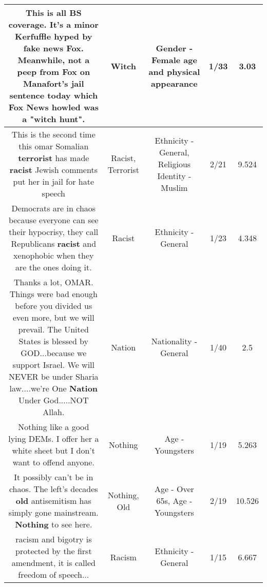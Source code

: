 \documentclass[11pt]{article}
\newlength\mylength
\begin{document}
\begin{center}
\begin{longtable}{|C{.65\mylength}|C{.30\mylength}|C{.12\mylength}|C{.12\mylength}|C{.12\mylength}|}
  \small This is all BS coverage. It's a minor Kerfuffle hyped by fake news Fox. Meanwhile, not a peep from Fox on Manafort's jail sentence today which Fox News howled was a "\textbf{witch} hunt".\normalsize   & Witch & Gender - Female age and physical appearance & 1/33 & 3.03 \\  \hline
  \small This is the second time this omar Somalian \textbf{terrorist} has made \textbf{racist} Jewish comments put her in jail for hate speech\normalsize   & Racist, Terrorist & Ethnicity - General, Religious Identity - Muslim & 2/21 & 9.524 \\  \hline
  \small Democrats are in chaos because everyone can see their hypocrisy, they call Republicans \textbf{racist} and xenophobic when they are the ones doing it.\normalsize   & Racist & Ethnicity - General & 1/23 & 4.348 \\  \hline
  \small Thanks a lot, OMAR. Things were bad enough before you divided us even more, but we will prevail. The United States is blessed by GOD...because we support Israel. We will NEVER be under Sharia law....we're One \textbf{Nation} Under God.....NOT Allah.\normalsize   & Nation & Nationality - General & 1/40 & 2.5 \\  \hline
  \small Nothing like a good lying DEMs. I offer her a white sheet but I don't want to offend anyone.\normalsize   & Nothing & Age - Youngsters & 1/19 & 5.263 \\  \hline
  \small It possibly can't be in chaos. The left's decades \textbf{old} antisemitism has simply gone mainstream. \textbf{Nothing} to see here.\normalsize   & Nothing, Old & Age - Over 65s, Age - Youngsters & 2/19 & 10.526 \\  \hline
  \small racism and bigotry is protected by the first amendment, it is called freedom of speech...\normalsize   & Racism & Ethnicity - General & 1/15 & 6.667 \\  \hline

\end{longtable}
\end{center}
\end{document}
